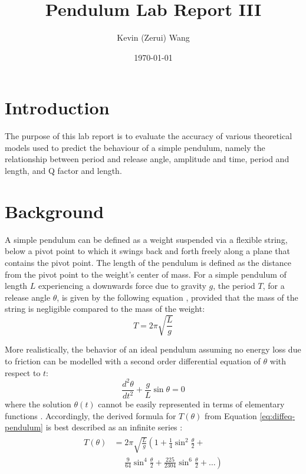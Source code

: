 \documentclass[11pt]{article}
\title{Pendulum Lab Report III}
\author{Kevin (Zerui) Wang}
\date{\today}
\begin{document}
\maketitle

{
\hypersetup{linkcolor=black}
\tableofcontents
}

\newpage


\begin{multicols}{2}
\section{Introduction}
{\color{blue}The purpose of this lab report is to evaluate the accuracy of various theoretical models used to predict the behaviour of a simple pendulum, namely the relationship between period and release angle, amplitude and time, period and length, and Q factor and length.}

\section{Background} \label{Background}
A simple pendulum can be defined as a weight suspended via a flexible string, below a pivot point to which it swings back and forth freely along a plane that contains the pivot point. The length of the pendulum is defined as the distance from the pivot point to the weight's center of mass. For a simple pendulum of length $L$ experiencing a downwards force due to gravity $g$, the period $T$, for a release angle $\theta$, is given by the following equation \cite{the-simple-pendulum}, provided that the mass of the string is negligible compared to the mass of the weight:
\begin{equation} \label{eq:l-over-g}
    T = 2\pi \sqrt{\frac{L}{g}}
\end{equation}



More realistically, the behavior of an ideal pendulum assuming no energy loss due to friction can be modelled with a second order differential equation of $\theta$ with respect to $t$:
\begin{equation} \label{eq:diffeq-pendulum}
    \frac{d^2\theta}{dt^2} + \frac{g}{L}\sin{\theta} = 0
\end{equation}
where the solution $\theta(t)$ cannot be easily represented in terms of elementary functions \cite{no-elementary-fns}. Accordingly, the derived formula for $T(\theta)$ from Equation \ref{eq:diffeq-pendulum} is best described as an infinite series \cite{no-elementary-fns-2}:
\begin{align} \label{eq:power-series-derived}
\begin{split}
    T(\theta) &= 2\pi\sqrt{\frac{L}{g}} \left(1 + \frac{1}{4}\sin^2\frac{\theta}{2} \right. + \\
    &\phantom{{}=}\left. \frac{9}{64}\sin^4\frac{\theta}{2} + \frac{225}{2304}\sin^6\frac{\theta}{2} + \ldots \right)
\end{split}
\end{align}



\end{multicols}
\end{document}
